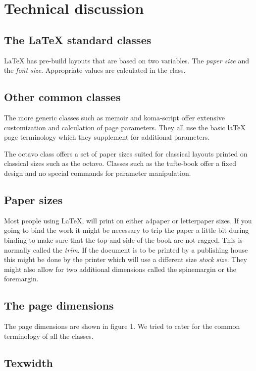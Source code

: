 \section{Technical discussion}
\subsection{The LaTeX standard classes}

LaTeX has pre-build layouts that are based on two variables. The \textit{paper size} and the \textit{font size}. Appropriate values are calculated in the class.

\subsection{Other common classes}

The more generic classes such as memoir and koma-script offer extensive customization and calculation of page parameters. They all use the basic laTeX page terminology which they supplement for additional parameters.

The octavo class offers a set of paper sizes suited for classical layouts printed on classical sizes such as the octavo. Classes such as the tufte-book offer a fixed design and no special commands for parameter manipulation.

\subsection{Paper sizes}
Most people using LaTeX, will print on either a4paper or letterpaper sizes. If you going to bind the work it might be necessary to trip the paper a little bit during binding to make sure that the top and side of the book are not ragged. This is normally called the \textit{trim}. If the document is to be printed by a publishing house this might be done by the printer which will use a different size \textit{stock size}. They might also allow for two additional dimensions called the spinemargin or the foremargin.

\subsection{The page dimensions}

The page dimensions are shown in figure 1. We tried to cater for the common terminology of all the classes.

\subsection{Texwidth}

